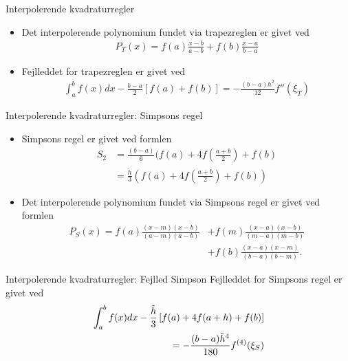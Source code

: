\begin{frame}{Interpolerende kvadraturregler}
\begin{itemize}
    \item Det interpolerende polynomium fundet via trapezreglen er givet ved
    \begin{align*}
    P_{T}(x)=f(a)\frac{x-b}{a-b}+f(b)\frac{x-a}{b-a}       
    \end{align*}
    \item Fejlleddet for trapezreglen er givet ved 
    \begin{align*}
    \int_{a}^{b}f(x)dx-\frac{b-a}{2}\left [ f(a)+f(b) \right ]=-\frac{(b-a)h^2}{12}{f}''(\xi_T)
    \end{align*}
\end{itemize}
\end{frame}


\begin{frame}{Interpolerende kvadraturregler: Simpsons regel}
    \begin{itemize}
    \item Simpsons regel er givet ved formlen 
    \begin{align*}
    S_2 &= \frac{(b-a)}{6}(f(a)+4f(\frac{a+b}{2})+f(b)\\
    &=\frac{\widetilde{h}}{3}(f(a)+4f(\frac{a+b}{2})+f(b))
    \end{align*}
    \item Det interpolerende polynomium fundet via Simpsons regel er givet ved formlen
    \begin{align*}
    P_{S}(x)=f(a)\frac{(x-m)(x-b)}{(a-m)(a-b)}&+f(m)\frac{(x-a)(x-b)}{(m-a)(m-b)}\\
    &+f(b)\frac{(x-a)(x-m)}{(b-a)(b-m)}.
    \end{align*}
       \end{itemize}
\end{frame}


\begin{frame}{Interpolerende kvadraturregler: Fejlled Simpson}
    Fejlleddet for Simpsons regel er givet ved 
    \begin{align*}
    \int_{a}^{b}f(x)dx-\frac{\Tilde{h}}{3}\left [ f(a)+4f(a+h) + f(b) \right ]\\
    =-\frac{(b-a)\Tilde{h}^4}{180}{f}^{(4)}(\xi_S)
    \end{align*}
    
\end{frame}


